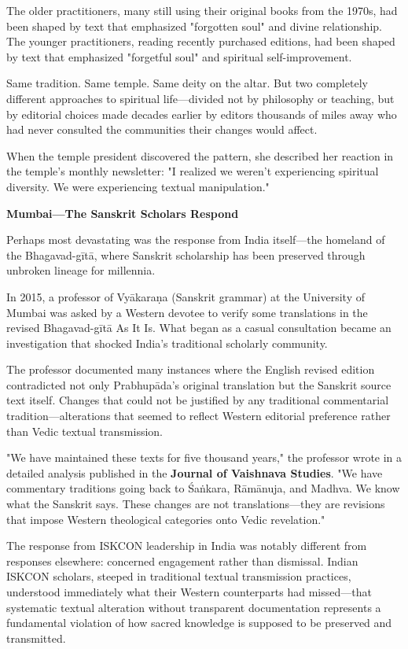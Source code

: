 \documentclass[12pt,twoside]{book}
\begin{document}
The older practitioners, many still using their original books from the 1970s, had been shaped by text that emphasized "forgotten soul" and divine relationship. The younger practitioners, reading recently purchased editions, had been shaped by text that emphasized "forgetful soul" and spiritual self-improvement.

Same tradition. Same temple. Same deity on the altar. But two completely different approaches to spiritual life—divided not by philosophy or teaching, but by editorial choices made decades earlier by editors thousands of miles away who had never consulted the communities their changes would affect.

When the temple president discovered the pattern, she described her reaction in the temple's monthly newsletter: "I realized we weren't experiencing spiritual diversity. We were experiencing textual manipulation."

\textbf{\textbf{Mumbai—The Sanskrit Scholars Respond}}

Perhaps most devastating was the response from India itself—the homeland of the Bhagavad-gītā, where Sanskrit scholarship has been preserved through unbroken lineage for millennia.

In 2015, a professor of Vyākaraṇa (Sanskrit grammar) at the University of Mumbai was asked by a Western devotee to verify some translations in the revised Bhagavad-gītā As It Is. What began as a casual consultation became an investigation that shocked India's traditional scholarly community.

The professor documented many instances where the English revised edition contradicted not only Prabhupāda's original translation but the Sanskrit source text itself. Changes that could not be justified by any traditional commentarial tradition—alterations that seemed to reflect Western editorial preference rather than Vedic textual transmission.

"We have maintained these texts for five thousand years," the professor wrote in a detailed analysis published in the \textbf{Journal of Vaishnava Studies}. "We have commentary traditions going back to Śaṅkara, Rāmānuja, and Madhva. We know what the Sanskrit says. These changes are not translations—they are revisions that impose Western theological categories onto Vedic revelation."

The response from ISKCON leadership in India was notably different from responses elsewhere: concerned engagement rather than dismissal. Indian ISKCON scholars, steeped in traditional textual transmission practices, understood immediately what their Western counterparts had missed—that systematic textual alteration without transparent documentation represents a fundamental violation of how sacred knowledge is supposed to be preserved and transmitted.
\end{document}
